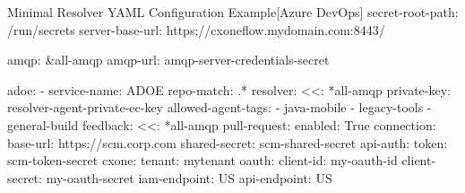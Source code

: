 \begin{code}{Minimal Resolver YAML Configuration Example}{[Azure DevOps]}{}
  secret-root-path: /run/secrets
  server-base-url: https://cxoneflow.mydomain.com:8443/

  amqp: &all-amqp
    amqp-url: amqp-server-credentials-secret

  adoe:
      - service-name: ADOE
        repo-match: .*
        resolver:
          <<: *all-amqp
          private-key: resolver-agent-private-ec-key
          allowed-agent-tags:
            - java-mobile
            - legacy-tools
            - general-build
        feedback:
          <<: *all-amqp
          pull-request:
            enabled: True
        connection:
          base-url: https://scm.corp.com
          shared-secret: scm-shared-secret
          api-auth:
            token: scm-token-secret
        cxone:
          tenant: mytenant
          oauth:
            client-id: my-oauth-id
            client-secret: my-oauth-secret
          iam-endpoint: US
          api-endpoint: US
\end{code}

